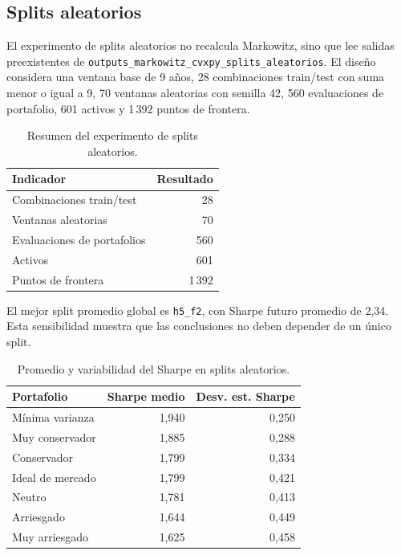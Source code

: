 \subsection*{Splits aleatorios}

El experimento de splits aleatorios no recalcula Markowitz, sino que lee
salidas preexistentes de
\texttt{outputs\_markowitz\_cvxpy\_splits\_aleatorios}. El dise\~no considera
una ventana base de 9 a\~nos, 28 combinaciones train/test con suma menor o igual
a 9, 70 ventanas aleatorias con semilla 42, 560 evaluaciones de portafolio,
601 activos y 1\,392 puntos de frontera.

\begin{table}[H]
\centering
\caption{Resumen del experimento de splits aleatorios.}
\label{tab:anexo4_splits_resumen}
\small
\begin{tabular}{@{}lr@{}}
\toprule
Indicador & Resultado \\
\midrule
Combinaciones train/test & 28 \\
Ventanas aleatorias & 70 \\
Evaluaciones de portafolios & 560 \\
Activos & 601 \\
Puntos de frontera & 1\,392 \\
\bottomrule
\end{tabular}
\end{table}

El mejor split promedio global es \texttt{h5\_f2}, con Sharpe futuro promedio de
2,34. Esta sensibilidad muestra que las conclusiones no deben depender de un
\'unico split.

\begin{table}[H]
\centering
\caption{Promedio y variabilidad del Sharpe en splits aleatorios.}
\label{tab:anexo4_splits_sharpe}
\small
\begin{tabular}{@{}lrr@{}}
\toprule
Portafolio & Sharpe medio & Desv. est. Sharpe \\
\midrule
M\'inima varianza & 1,940 & 0,250 \\
Muy conservador & 1,885 & 0,288 \\
Conservador & 1,799 & 0,334 \\
Ideal de mercado & 1,799 & 0,421 \\
Neutro & 1,781 & 0,413 \\
Arriesgado & 1,644 & 0,449 \\
Muy arriesgado & 1,625 & 0,458 \\
\bottomrule
\end{tabular}
\end{table}

